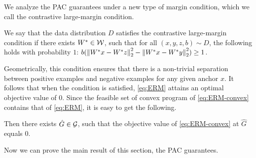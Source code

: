 We analyze the PAC guarantees under a new type of margin condition, which we call the contrastive large-margin condition.

\begin{definition}
We say that the data distribution $D$ satisfies the contrastive large-margin condition if there exists $W^* \in \mathcal{W}$, such that for all $(x, y, z, b) \sim D$, the following holds with probability $1$: $b( \left\lVert W^*x - W^*z \right\rVert_{2}^2 - \left\lVert W^*x - W^*y \right\rVert_{2}^2) \geq 1$.
\end{definition}

Geometrically, this condition ensures that there is a non-trivial separation between positive examples and negative examples for any given anchor $x$. It follows that when the condition is satisfied, \eqref{eq:ERM} attains an optimal objective value of $0$. Since the feasible set of convex program of \eqref{eq:ERM-convex} contains that of \eqref{eq:ERM}, it is easy to get the following.

\begin{lemma}
 Then there exists $\hat{G} \in \mathcal{G}$, such that the objective value of \eqref{eq:ERM-convex} at $\hat{G}$ equals $0$.
\end{lemma}

Now we can prove the main result of this section, the PAC guarantees. 


